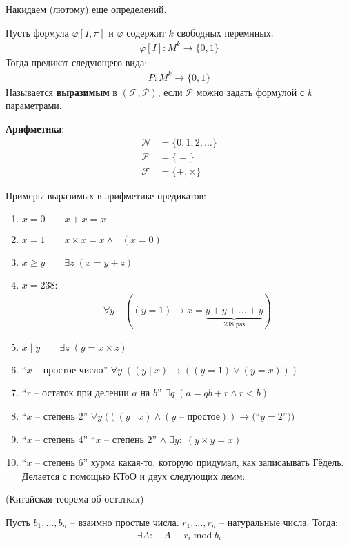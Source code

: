 Накидаем (лютому) еще определений. 
\begin{conj}
    Пусть формула $\varphi [I, \pi]$ и $\varphi$ содержит $k$ свободных перемнных. 
    \begin{gather*}
        \varphi[I] : M^k \longrightarrow \{0, 1\}
    \end{gather*}
    Тогда предикат следующего вида:
    \begin{gather*}
        P : M^k \longrightarrow \{0, 1\} 
    \end{gather*}
    Называется \textbf{выразимым} в $(\mathcal{F}, \mathcal{P})$, если $\mathcal{P}$ можно задать формулой с $k$ параметрами. 
\end{conj}

\begin{conj}
    \textbf{Арифметика}:
    \begin{align*}
        \mathcal{N} &= \{0, 1, 2, \dots\} \\
        \mathcal{P} &= \{=\} \\
        \mathcal{F} &= \{+, \times \}
    \end{align*}
\end{conj}
Примеры выразимых в арифметике предикатов:
\begin{enumerate}
    \item $x = 0 \qquad x+x=x$
    \item $x=1 \qquad x \times x = x \land \lnot (x=0)$
    \item $x \geqslant y \qquad \exists z \; (x = y + z)$
    \item $x = 238$:
    \begin{gather*}
        \forall y \quad ((y=1) \longrightarrow x = \underbrace{y + y + \dots + y}_{238 \text{ раз}})
    \end{gather*}
    \item $x \mid y \qquad \exists z \; (y = x \times z)$
    \item ``$x$ -- простое число'' \qquad $\forall y \; ((y \mid x) \longrightarrow ((y=1) \lor (y=x)))$
    \item ``$r$ -- остаток при делении $a$ на $b$'' \qquad $\exists q \; (a = qb + r \land r < b)$
    \item ``$x$ -- степень 2'' \qquad $\forall y \; (((y \mid x) \land (y \text{ -- простое})) \longrightarrow ($``$y=2$''$))$
    \item ``$x$ -- степень 4'' \qquad ``$x$ -- степень 2'' $\land \; \exists y : \;(y \times y = x)$
    \item ``$x$ -- степень 6'' \qquad хурма какая-то, которую придумал, как записаывать Гёдель. Делается с помощью КТоО и двух следующих лемм: 
\end{enumerate}
\begin{theorem}(Китайская теорема об остатках)

    Пусть $b_1, \dots, b_n$ -- взаимно простые числа. $r_1, \dots, r_n$ -- натуральные числа. Тогда:
        \begin{gather*}
            \exists A : \quad A \equiv r_i \operatorname{mod} b_i
        \end{gather*}
\end{theorem}

